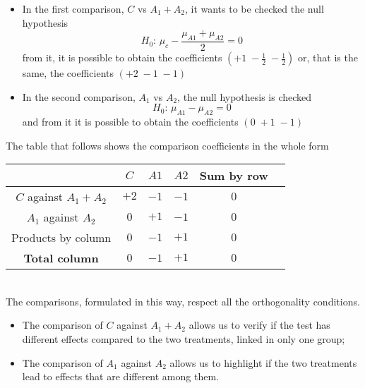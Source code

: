 \begin{frame}
  \vspace*{.75cm}
  \begin{itemize}
    \item In the first comparison, $C$ vs $A_1+A_2$, it wants to be checked the null hypothesis
    $$ H_0:\,\mu_c-\frac{\mu_{A1}+\mu_{A2}}{2} = 0 $$
    from it, it is possible to obtain the coefficients $(+1\;-\frac{1}{2}\;-\frac{1}{2})$ or, that is the same, the coefficients $ (+2 \; -1 \; -1) $\\
    \vspace*{.75cm}
    \item In the second comparison, $A_1$ vs $A_2$, the null hypothesis is checked
    $$ H_0:\,\mu_{A1}-\mu_{A2} = 0 $$
    and from it it is possible to obtain the coefficients $(0\;+1\;-1)$
  \end{itemize}
\end{frame}

\begin{frame}
  \vspace{.25cm}
  The table that follows shows the comparison coefficients in the whole form\\
  \vspace{.25cm}
  \hspace{.75cm}
  \begin{tabular}{|c|c|c|c|c c|}
    \cline{2-6}
    \multicolumn{1}{c|}{\hspace*{3.5cm}}  & $ C $  & $ A1 $ & $ A2 $ & \textbf{Sum by row} & \\ \hline
                    $C$ against $A_1+A_2$  & $ +2 $ & $ -1 $ & $ -1 $ & $ 0 $                   & \\ \hline
                      $A_1$ against $A_2$  & $ 0 $  & $ +1 $ & $ -1 $ & $ 0 $                   & \\ \hline
                    Products by column  & $ 0 $  & $ -1 $ & $ +1 $ & $ 0 $                   & \\ \hline
                 \textbf{Total column}  & $ 0 $  & $ -1 $ & $ +1 $ & $ 0 $                   & \\ \hline
  \end{tabular}\\
  \vspace{0.2cm}
  The comparisons, formulated in this way, respect all the orthogonality conditions.\\
  \vspace{.20cm}
  \begin{itemize}
    \item The comparison of $C$ against $A_1+A_2$ allows us to verify if the test has different effects compared to the two treatments, linked in only one group;
    \item The comparison of $A_1$ against $A_2$ allows us to highlight if the two treatments lead to effects that are different among them.  
  \end{itemize}
\end{frame}

